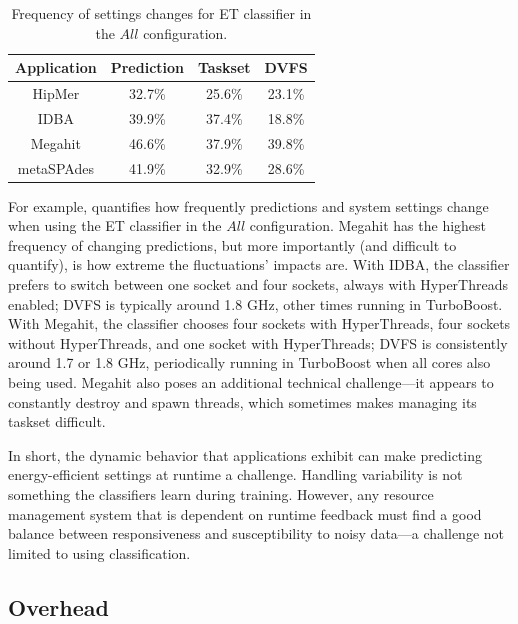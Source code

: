 \begin{table}[t]
\caption{Frequency of settings changes for ET classifier in the $All$ configuration.}
\label{tbl:classifiers-actuation}
\small
\centering
\begin{tabular}{c|c|c|c}
  \textbf{Application} & \textbf{Prediction} & \textbf{Taskset} & \textbf{DVFS} \\
  \hline
  HipMer     & 32.7\% & 25.6\% & 23.1\% \\
  IDBA       & 39.9\% & 37.4\% & 18.8\% \\
  Megahit    & 46.6\% & 37.9\% & 39.8\% \\
  metaSPAdes & 41.9\% & 32.9\% & 28.6\% \\
  \hline
\end{tabular}
\end{table}

For example,  quantifies how frequently predictions and system settings change when using the ET classifier in the $All$ configuration.
Megahit has the highest frequency of changing predictions, but more importantly (and difficult to quantify), is how extreme the fluctuations' impacts	 are.
With IDBA, the classifier prefers to switch between one socket and four sockets, always with HyperThreads enabled; DVFS is typically around 1.8 GHz, other times running in TurboBoost.
With Megahit, the classifier chooses four sockets with HyperThreads, four sockets without HyperThreads, and one socket with HyperThreads; DVFS is consistently around 1.7 or 1.8 GHz, periodically running in TurboBoost when all cores also being used.
Megahit also poses an additional technical challenge---it appears to constantly destroy and spawn threads, which sometimes makes managing its taskset difficult.

In short, the dynamic behavior that applications exhibit can make predicting energy-efficient settings at runtime a challenge.
Handling variability is not something the classifiers learn during training.
However, any resource management system that is dependent on runtime feedback must find a good balance between responsiveness and susceptibility to noisy data---a challenge not limited to using classification.


\subsection{Overhead}
\label{sec:classifiers-eval-overhead}


